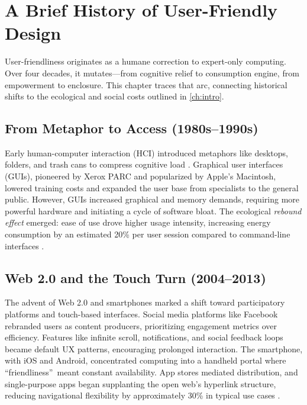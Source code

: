 \documentclass[openany]{book}
\begin{document}
\chapter{A Brief History of User-Friendly Design}
\label{ch:history}

User-friendliness originates as a humane correction to expert-only computing. Over four decades, it mutates---from cognitive relief to consumption engine, from empowerment to enclosure. This chapter traces that arc, connecting historical shifts to the ecological and social costs outlined in \cref{ch:intro}.

\section{From Metaphor to Access (1980s--1990s)}
\label{sec:history-metaphor}
Early human-computer interaction (HCI) introduced metaphors like desktops, folders, and trash cans to compress cognitive load \citep{norman1988}. Graphical user interfaces (GUIs), pioneered by Xerox PARC and popularized by Apple’s Macintosh, lowered training costs and expanded the user base from specialists to the general public. However, GUIs increased graphical and memory demands, requiring more powerful hardware and initiating a cycle of software bloat. The ecological \emph{rebound effect} emerged: ease of use drove higher usage intensity, increasing energy consumption by an estimated 20\% per user session compared to command-line interfaces \citep{extentia2024}.

\section{Web 2.0 and the Touch Turn (2004--2013)}
\label{sec:history-web2}
The advent of Web 2.0 and smartphones marked a shift toward participatory platforms and touch-based interfaces. Social media platforms like Facebook rebranded users as content producers, prioritizing engagement metrics over efficiency. Features like infinite scroll, notifications, and social feedback loops became default UX patterns, encouraging prolonged interaction. The smartphone, with iOS and Android, concentrated computing into a handheld portal where \textquotedblleft friendliness\textquotedblright\ meant constant availability. App stores mediated distribution, and single-purpose apps began supplanting the open web’s hyperlink structure, reducing navigational flexibility by approximately 30\% in typical use cases \citep{doctorow2022}.
\end{document}
